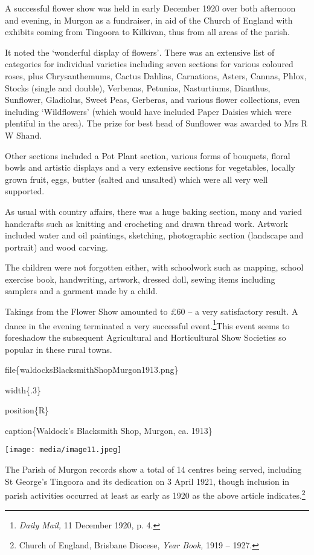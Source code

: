 A successful flower show was held in early December 1920 over both
afternoon and evening, in Murgon as a fundraiser, in aid of the Church
of England with exhibits coming from Tingoora to Kilkivan, thus from all
areas of the parish.

It noted the `wonderful display of flowers'\emph{.} There was an
extensive list of categories for individual varieties including seven
sections for various coloured roses, plus Chrysanthemums, Cactus
Dahlias, Carnations, Asters, Cannas, Phlox, Stocks (single and double),
Verbenas, Petunias, Nasturtiums, Dianthus, Sunflower, Gladiolus, Sweet
Peas, Gerberas, and various flower collections, even including
`Wildflowers' (which would have included Paper Daisies which were
plentiful in the area). The prize for best head of Sunflower was awarded
to Mrs R W Shand.

Other sections included a Pot Plant section, various forms of bouquets,
floral bowls and artistic displays and a very extensive sections for
vegetables, locally grown fruit, eggs, butter (salted and unsalted)
which were all very well supported.

As usual with country affairs, there was a huge baking section, many and
varied handcrafts such as knitting and crocheting and drawn thread work.
Artwork included water and oil paintings, sketching, photographic
section (landscape and portrait) and wood carving.

The children were not forgotten either, with schoolwork such as mapping,
school exercise book, handwriting, artwork, dressed doll, sewing items
including samplers and a garment made by a child.

Takings from the Flower Show amounted to £60 -- a very satisfactory
result. A dance in the evening terminated a very successful
event.\footnote{\emph{Daily Mail,} 11 December 1920, p. 4.}This event
seems to foreshadow the subsequent Agricultural and Horticultural Show
Societies so popular in these rural towns.

file\{waldocksBlacksmithShopMurgon1913.png\}

width\{.3\}

position\{R\}

caption\{Waldock's Blacksmith Shop, Murgon, ca. 1913\}

\texttt{[image: media/image11.jpeg]}

The Parish of Murgon records show a total of 14 centres being served,
including St George's Tingoora and its dedication on 3 April 1921,
though inclusion in parish activities occurred at least as early as 1920
as the above article indicates.\footnote{Church of England, Brisbane
  Diocese, \emph{Year Book,} 1919 -- 1927.}

